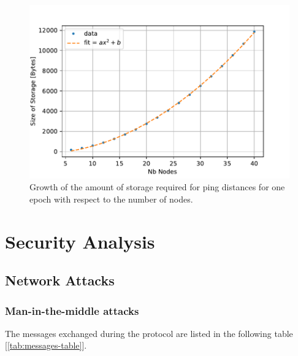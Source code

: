 \documentclass[a4paper,11pt,twoside,openright]{report}
\begin{document}
\begin{figure}[!h] 
\centering
\includegraphics[width=350pt]{figures/storage-plot}
\caption{Growth of the amount of storage required for ping distances for one epoch with
 respect to the number of nodes. } \label{fig:storage-plot}
\end{figure}

\section{Security Analysis}
\subsection{Network Attacks} 
\subsubsection{Man-in-the-middle attacks} \label{MitM}
The messages exchanged during the protocol are listed in the following table [\autoref{tab:messages-table}].
\end{document}

